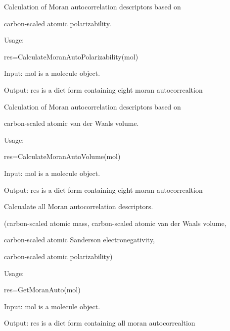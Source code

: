 \documentclass[letterpaper,10pt,english]{sphinxmanual}
\begin{document}

\begin{fulllineitems}
\label{reference/moran:moran.CalculateMoranAutoPolarizability}
Calculation of Moran autocorrelation descriptors based on

carbon-scaled atomic polarizability.

Usage:

res=CalculateMoranAutoPolarizability(mol)

Input: mol is a molecule object.

Output: res is a dict form containing eight moran autocorrealtion

\end{fulllineitems}


\begin{fulllineitems}
\label{reference/moran:moran.CalculateMoranAutoVolume}
Calculation of Moran autocorrelation descriptors based on

carbon-scaled atomic van der Waals volume.

Usage:

res=CalculateMoranAutoVolume(mol)

Input: mol is a molecule object.

Output: res is a dict form containing eight moran autocorrealtion

\end{fulllineitems}


\begin{fulllineitems}
\label{reference/moran:moran.GetMoranAuto}
Calcualate all Moran autocorrelation descriptors.

(carbon-scaled atomic mass, carbon-scaled atomic van der Waals volume,

carbon-scaled atomic Sanderson electronegativity,

carbon-scaled atomic polarizability)

Usage:

res=GetMoranAuto(mol)

Input: mol is a molecule object.

Output: res is a dict form containing all moran autocorrealtion

\end{fulllineitems}
\end{document}
